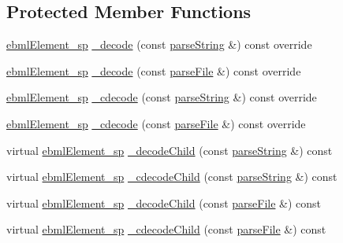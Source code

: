 \subsection*{Protected Member Functions}
\begin{DoxyCompactItemize}
\item 
\mbox{\hyperlink{namespaceebml_adad533b7705a16bb360fe56380c5e7be}{ebml\+Element\+\_\+sp}} \mbox{\hyperlink{classebml_1_1ebmlMasterElementClass_a4499f7187f0480518080cf8135884981}{\+\_\+decode}} (const \mbox{\hyperlink{classebml_1_1parseString}{parse\+String}} \&) const override
\item 
\mbox{\hyperlink{namespaceebml_adad533b7705a16bb360fe56380c5e7be}{ebml\+Element\+\_\+sp}} \mbox{\hyperlink{classebml_1_1ebmlMasterElementClass_aeda43063d78233403fa084800ff9c109}{\+\_\+decode}} (const \mbox{\hyperlink{classebml_1_1parseFile}{parse\+File}} \&) const override
\item 
\mbox{\hyperlink{namespaceebml_adad533b7705a16bb360fe56380c5e7be}{ebml\+Element\+\_\+sp}} \mbox{\hyperlink{classebml_1_1ebmlMasterElementClass_a8b57f2fe211ab7a418f8b7d4a981a1d7}{\+\_\+cdecode}} (const \mbox{\hyperlink{classebml_1_1parseString}{parse\+String}} \&) const override
\item 
\mbox{\hyperlink{namespaceebml_adad533b7705a16bb360fe56380c5e7be}{ebml\+Element\+\_\+sp}} \mbox{\hyperlink{classebml_1_1ebmlMasterElementClass_a6ef689ac153338400cfb8367edd32f54}{\+\_\+cdecode}} (const \mbox{\hyperlink{classebml_1_1parseFile}{parse\+File}} \&) const override
\item 
virtual \mbox{\hyperlink{namespaceebml_adad533b7705a16bb360fe56380c5e7be}{ebml\+Element\+\_\+sp}} \mbox{\hyperlink{classebml_1_1ebmlMasterElementClass_a20fcd3470130b32bf42317ccb45d6deb}{\+\_\+decode\+Child}} (const \mbox{\hyperlink{classebml_1_1parseString}{parse\+String}} \&) const
\item 
virtual \mbox{\hyperlink{namespaceebml_adad533b7705a16bb360fe56380c5e7be}{ebml\+Element\+\_\+sp}} \mbox{\hyperlink{classebml_1_1ebmlMasterElementClass_a3cdeaebf9f16bdebfb72006410f3d76e}{\+\_\+cdecode\+Child}} (const \mbox{\hyperlink{classebml_1_1parseString}{parse\+String}} \&) const
\item 
virtual \mbox{\hyperlink{namespaceebml_adad533b7705a16bb360fe56380c5e7be}{ebml\+Element\+\_\+sp}} \mbox{\hyperlink{classebml_1_1ebmlMasterElementClass_a20d1de1b0cd199e636d5d36525da088e}{\+\_\+decode\+Child}} (const \mbox{\hyperlink{classebml_1_1parseFile}{parse\+File}} \&) const
\item 
virtual \mbox{\hyperlink{namespaceebml_adad533b7705a16bb360fe56380c5e7be}{ebml\+Element\+\_\+sp}} \mbox{\hyperlink{classebml_1_1ebmlMasterElementClass_a74a5490b76740719142fbbbded466ae1}{\+\_\+cdecode\+Child}} (const \mbox{\hyperlink{classebml_1_1parseFile}{parse\+File}} \&) const
\end{DoxyCompactItemize}
